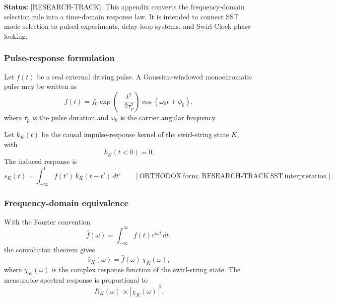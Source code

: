         \noindent
        \textbf{Status:} [RESEARCH-TRACK].
        This appendix converts the frequency-domain selection rule into a time-domain response law. It is intended to connect SST mode selection to pulsed experiments, delay-loop systems, and Swirl-Clock phase locking.
    
    \subsubsection*{Pulse-response formulation}
        
        Let \(f(t)\) be a real external driving pulse. A Gaussian-windowed monochromatic pulse may be written as
        \begin{equation}
            f(t)
            =
            f_0
            \exp\!\left(-\frac{t^2}{2\tau_p^2}\right)
            \cos(\omega_0 t+\phi_0),
            \label{eq:gaussian_drive_pulse}
        \end{equation}
        where \(\tau_p\) is the pulse duration and \(\omega_0\) is the carrier angular frequency.
        
        Let \(k_K(t)\) be the causal impulse-response kernel of the swirl-string state \(K\), with
        \begin{equation}
            k_K(t<0)=0.
        \end{equation}
        The induced response is
        \begin{equation}
            \boxed{
                s_K(t)
                =
                \int_{-\infty}^{t}
                f(t')\,k_K(t-t')\,dt'
            }
            \qquad
            [\mathrm{ORTHODOX\ form;\ RESEARCH\text{-}TRACK\ SST\ interpretation}].
            \label{eq:SST_convolution_response}
        \end{equation}
    
    \subsubsection*{Frequency-domain equivalence}
        
        With the Fourier convention
        \[
            \hat f(\omega)
            =
            \int_{-\infty}^{\infty}
            f(t)e^{i\omega t}\,dt,
        \]
        the convolution theorem gives
        \begin{equation}
            \hat s_K(\omega)
            =
            \hat f(\omega)\,\chi_K(\omega),
            \label{eq:frequency_response_chi}
        \end{equation}
        where \(\chi_K(\omega)\) is the complex response function of the swirl-string state. The measurable spectral response is proportional to
        \begin{equation}
            R_K(\omega)
            \propto
            |\chi_K(\omega)|^2.
            \label{eq:response_modulus}
        \end{equation}
    
